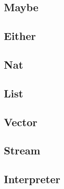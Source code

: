 \documentclass{article}
\theoremstyle{definition}
\begin{document}
\subsection{Maybe}

\subsection{Either}

\subsection{Nat}

\subsection{List}

\subsection{Vector}

\subsection{Stream}

\subsection{Interpreter}
\end{document}
